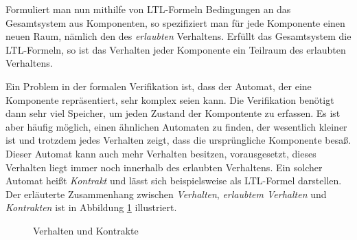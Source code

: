 Formuliert man nun mithilfe von LTL-Formeln Bedingungen an das Gesamtsystem aus Komponenten, so spezifiziert man für jede Komponente einen neuen Raum, nämlich den des \emph{erlaubten} Verhaltens.
Erfüllt das Gesamtsystem die LTL-Formeln, so ist das Verhalten jeder Komponente ein Teilraum des erlaubten Verhaltens.

Ein Problem in der formalen Verifikation ist, dass der Automat, der eine Komponente repräsentiert, sehr komplex seien kann.
Die Verifikation benötigt dann sehr viel Speicher, um jeden Zustand der Kompontente zu erfassen.
Es ist aber häufig möglich, einen ähnlichen Automaten zu finden, der wesentlich kleiner ist und trotzdem jedes Verhalten zeigt, dass die ursprüngliche Komponente besaß.
Dieser Automat kann auch mehr Verhalten besitzen, vorausgesetzt, dieses Verhalten liegt immer noch innerhalb des erlaubten Verhaltens.
Ein solcher Automat heißt \emph{Kontrakt} und lässt sich beispielsweise als LTL-Formel darstellen.
Der erläuterte Zusammenhang zwischen \emph{Verhalten}, \emph{erlaubtem Verhalten} und \emph{Kontrakten} ist in Abbildung \ref{fig:contracts} illustriert.
\begin{figure}[h]
  \centering
  \caption{Verhalten und Kontrakte}
  \label{fig:contracts}
\end{figure}